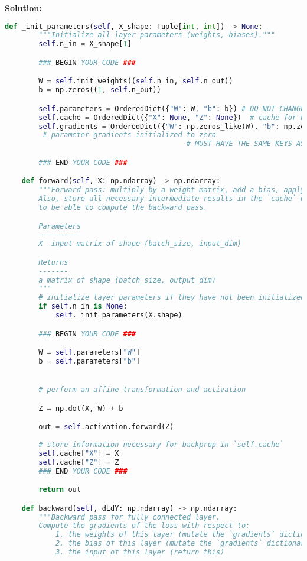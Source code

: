 \documentclass{article}
\newenvironment{solution}{\color{blue} \smallskip \textbf{Solution:}}{}
\begin{document}
\begin{solution}
\begin{lstlisting}[language=Python]
    def _init_parameters(self, X_shape: Tuple[int, int]) -> None:
        """Initialize all layer parameters (weights, biases)."""
        self.n_in = X_shape[1]

        ### BEGIN YOUR CODE ###

        W = self.init_weights((self.n_in, self.n_out))
        b = np.zeros((1, self.n_out))

        self.parameters = OrderedDict({"W": W, "b": b}) # DO NOT CHANGE THE KEYS
        self.cache = OrderedDict({"X": None, "Z": None})  # cache for backprop
        self.gradients = OrderedDict({"W": np.zeros_like(W), "b": np.zeros_like(b)})
         # parameter gradients initialized to zero
                                           # MUST HAVE THE SAME KEYS AS `self.parameters`

        ### END YOUR CODE ###

    def forward(self, X: np.ndarray) -> np.ndarray:
        """Forward pass: multiply by a weight matrix, add a bias, apply activation.
        Also, store all necessary intermediate results in the `cache` dictionary
        to be able to compute the backward pass.

        Parameters
        ----------
        X  input matrix of shape (batch_size, input_dim)

        Returns
        -------
        a matrix of shape (batch_size, output_dim)
        """
        # initialize layer parameters if they have not been initialized
        if self.n_in is None:
            self._init_parameters(X.shape)

        ### BEGIN YOUR CODE ###

        W = self.parameters["W"]
        b = self.parameters["b"]


        # perform an affine transformation and activation

        Z = np.dot(X, W) + b

        out = self.activation.forward(Z)
        
        # store information necessary for backprop in `self.cache`
        self.cache["X"] = X
        self.cache["Z"] = Z
        ### END YOUR CODE ###

        return out

    def backward(self, dLdY: np.ndarray) -> np.ndarray:
        """Backward pass for fully connected layer.
        Compute the gradients of the loss with respect to:
            1. the weights of this layer (mutate the `gradients` dictionary)
            2. the bias of this layer (mutate the `gradients` dictionary)
            3. the input of this layer (return this)


\end{lstlisting}
\end{solution}
\end{document}
